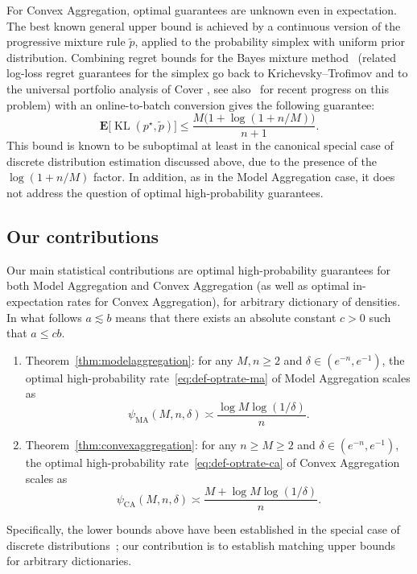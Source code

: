 \documentclass[11pt]{article}
\newcommand{\E}{{\mathbf E}}
\renewcommand{\geq}{\geqslant}
\renewcommand{\le}{\leqslant}
\newcommand{\wt}{\widetilde}
\newcommand{\M}{M}
\newcommand{\kl}{\operatorname{KL}}
\theoremstyle{definition}
\theoremstyle{remark}
\begin{document}
For Convex Aggregation, optimal guarantees are unknown even in expectation.
The best known general upper bound is achieved by a continuous version of the progressive mixture rule $\wt p$, applied to the probability simplex with uniform prior distribution.
Combining regret bounds for the Bayes mixture method~\cite{hazan2007logarithmic} (related log-loss regret guarantees for the simplex go back to Krichevsky--Trofimov \cite{krichevsky1981performance} and to the universal portfolio analysis of Cover \cite{cover1991universal}, see also~\cite{jezequel2025efficient} for recent progress on this problem) with an online-to-batch conversion gives the following guarantee:
\begin{equation}
    \label{eq:simplex}
\E\big[\kl(p^\star,\widetilde{p})\big]\le\frac{\M\big(1+\log(1+n/\M)\big)}{n+1}.
\end{equation}
This bound is known to be suboptimal at least in the canonical special case of discrete distribution estimation discussed above, due to the presence of the $\log (1+ n/M)$ factor.
In addition, as in the Model Aggregation case, it does not address the question of optimal high-probability guarantees.

\subsection{Our contributions}

Our main statistical contributions are optimal high-probability guarantees for both Model Aggregation and Convex Aggregation (as well as optimal in-expectation rates for Convex Aggregation), for arbitrary dictionary of densities.
In what follows $a \lesssim b$ means that there exists an absolute constant $c > 0$ such that $a \le cb$.

\begin{framed}
  \begin{enumerate}
  \item Theorem~\ref{thm:modelaggregation}: for any $M, n \geq 2$ and $\delta \in (e^{-n}, e^{-1})$, the optimal high-probability rate~\eqref{eq:def-optrate-ma} of Model Aggregation scales as
    \begin{equation*}
      \psi_{\mathrm{MA}} (M, n, \delta)
      \asymp \frac{\log M \log (1/\delta)}{n}.
    \end{equation*}
  \item Theorem~\ref{thm:convexaggregation}: for any $n \geq M \geq 2$ and $\delta \in (e^{-n}, e^{-1})$, the optimal high-probability rate~\eqref{eq:def-optrate-ca} of Convex Aggregation scales as
    \begin{equation*}
      \psi_{\mathrm{CA}} (M, n, \delta)
      \asymp \frac{M + \log M \log (1/\delta)}{n}.
    \end{equation*}
  \end{enumerate}
\end{framed}
Specifically, the lower bounds above have been established in the special case of discrete distributions~\cite{mourtada2025estimation,van2025nearly}; our contribution is to establish matching upper bounds for arbitrary dictionaries.
\end{document}
